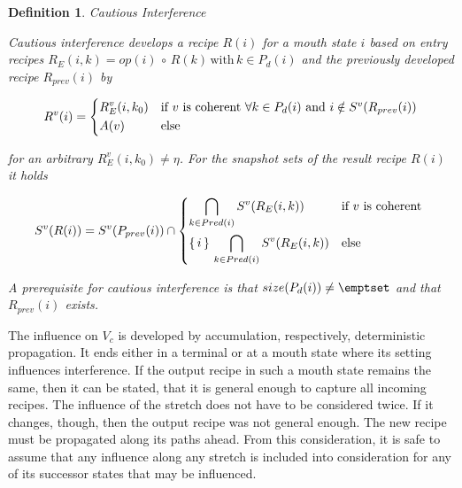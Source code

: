 \documentclass[12pt,a4paper]{scrartcl}
\newtheorem{definition}{Definition}
\begin{document}
\begin{definition} Cautious Interference

    Cautious interference develops a recipe $R(i)$ for a mouth state $i$ 
    based on entry recipes $R_E(i,k) =
    op(i)\,\circ\,R(k)\,\mbox{with}\,k \in P_d(i)$ and the previously developed
    recipe $R_{prev}(i)$ by 

    \begin{equation} \label{eq:opt-interference-output}
        R^v(i) = 
        \begin{dcases*}
            R_E^v(i,k_0) & if $v$ is coherent $\forall  k\in P_d(i)$ and $i\notin S^v(R_{prev}(i))$\\
            A(v)         & else
        \end{dcases*}
    \end{equation}

    for an arbitrary $R_E^v(i,k_0)\neq\eta$. For the snapshot sets of the
    result recipe $R(i)$ it holds

    \begin{equation} \label{eq:interference-snapshot-sets}
        S^v(R(i)) = S^v(P_{prev}(i)) \cap
        \begin{dcases*}
            \bigcap_{k\in Pred(i)} S^v(R_E(i,k))            & if $v$ is coherent \\
            \{\,i\,\}\,\bigcap_{k\in Pred(i)} S^v(R_E(i,k)) & else \\
        \end{dcases*}
    \end{equation}

    A prerequisite for cautious interference is that $size(P_d(i)) \neq
    \emptset$ and that $R_{prev}(i)$ exists.

\end{definition}

The influence on $V_c$ is developed by accumulation, respectively,
deterministic propagation. It ends either in a terminal or at a mouth state
where its setting influences interference. If the output recipe in such a mouth
state remains the same, then it can be stated, that it is general enough to
capture all incoming recipes. The influence of the stretch does not have to be
considered twice. If it changes, though, then the output recipe was not general
enough. The new recipe must be propagated along its paths ahead.  From this
consideration, it is safe to assume that any influence along any stretch is
included into consideration for any of its successor states that may be
influenced.
\end{document}
